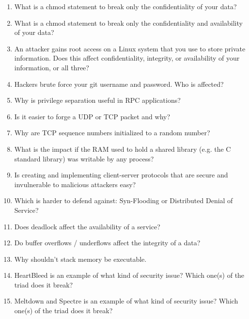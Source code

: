 \begin{enumerate}
\item What is a chmod statement to break only the confidentiality of your data?

\item What is a chmod statement to break only the confidentiality and availability of your data?

\item An attacker gains root access on a Linux system that you use to store private information. Does this affect confidentiality, integrity, or availability of your information, or all three?

\item Hackers brute force your git username and password. Who is affected?

\item Why is privilege separation useful in RPC applications?

\item Is it easier to forge a UDP or TCP packet and why? 

\item Why are TCP sequence numbers initialized to a random number?

\item What is the impact if the RAM used to hold a shared library (e.g. the C standard library) was writable by any process?

\item Is creating and implementing client-server protocols that are secure and invulnerable to malicious attackers easy?

\item Which is harder to defend against: Syn-Flooding or Distributed Denial of Service?

\item Does deadlock affect the availability of a service?

\item Do buffer overflows / underflows affect the integrity of a data?

\item Why shouldn't stack memory be executable.

\item HeartBleed is an example of what kind of security issue? Which one(s) of the triad does it break?

\item Meltdown and Spectre is an example of what kind of security issue? Which one(s) of the triad does it break?

\end{enumerate}



